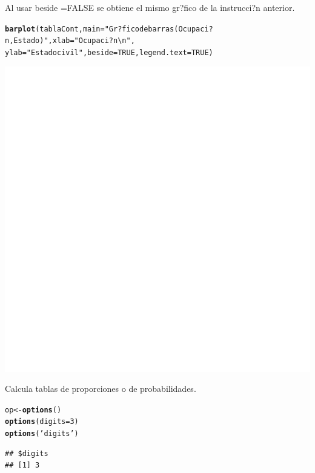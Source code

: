 \documentclass[10pt,a4paper]{article}\usepackage[]{graphicx}\usepackage[]{color}
\makeatletter
\def\maxwidth{ %
  \ifdim\Gin@nat@width>\linewidth
    \linewidth
  \else
    \Gin@nat@width
  \fi
}
\newcommand{\hlnum}[1]{\textcolor[rgb]{0.686,0.059,0.569}{#1}}%
\newcommand{\hlstr}[1]{\textcolor[rgb]{0.192,0.494,0.8}{#1}}%
\newcommand{\hlstd}[1]{\textcolor[rgb]{0.345,0.345,0.345}{#1}}%
\newcommand{\hlkwb}[1]{\textcolor[rgb]{0.69,0.353,0.396}{#1}}%
\newcommand{\hlkwc}[1]{\textcolor[rgb]{0.333,0.667,0.333}{#1}}%
\newcommand{\hlkwd}[1]{\textcolor[rgb]{0.737,0.353,0.396}{\textbf{#1}}}%
\newenvironment{kframe}{%
 \def\at@end@of@kframe{}%
 \ifinner\ifhmode%
  \def\at@end@of@kframe{\end{minipage}}%
  \begin{minipage}{\columnwidth}%
 \fi\fi%
 \def\FrameCommand##1{\hskip\@totalleftmargin \hskip-\fboxsep
 \colorbox{shadecolor}{##1}\hskip-\fboxsep
     \hskip-\linewidth \hskip-\@totalleftmargin \hskip\columnwidth}%
 \MakeFramed {\advance\hsize-\width
   \@totalleftmargin\z@ \linewidth\hsize
   \@setminipage}}%
 {\par\unskip\endMakeFramed%
 \at@end@of@kframe}
\newenvironment{knitrout}{}{} %
\makeatother
\begin{document}
Al usar beside =FALSE se obtiene el mismo gr?fico de la instrucci?n anterior.
\begin{knitrout}
\color{fgcolor}\begin{kframe}
\begin{alltt}
\hlkwd{barplot}\hlstd{(tablaCont,} \hlkwc{main}\hlstd{=}\hlstr{"Gr?fico de barras (Ocupaci?n, Estado)"}\hlstd{,} \hlkwc{xlab}\hlstd{=}\hlstr{"Ocupaci?n\textbackslash{}n"}\hlstd{,}
\hlkwc{ylab}\hlstd{=}\hlstr{"Estado civil"}\hlstd{,} \hlkwc{beside}\hlstd{=}\hlnum{TRUE}\hlstd{,} \hlkwc{legend.text}\hlstd{=}\hlnum{TRUE}\hlstd{)}
\end{alltt}
\end{kframe}
\includegraphics[width=\maxwidth]{figure/unnamed-chunk-8-1} 

\end{knitrout}

Calcula tablas de proporciones o de probabilidades. 
\begin{knitrout}
\color{fgcolor}\begin{kframe}
\begin{alltt}
\hlstd{op} \hlkwb{<-} \hlkwd{options}\hlstd{()}
\hlkwd{options}\hlstd{(}\hlkwc{digits}\hlstd{=}\hlnum{3}\hlstd{)}
\hlkwd{options}\hlstd{(}\hlstr{'digits'}\hlstd{)}
\end{alltt}
\begin{verbatim}
## $digits
## [1] 3
\end{verbatim}
\end{kframe}
\end{knitrout}

 
\end{document}
